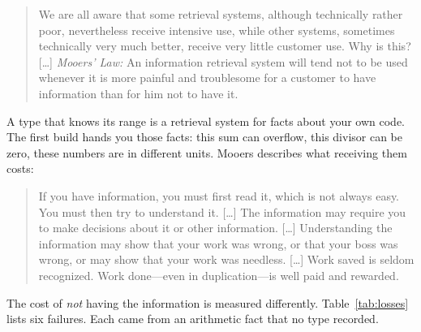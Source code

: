 \documentclass[11pt,a4paper]{article}
\begin{document}
\begin{quote}\small
We are all aware that some retrieval systems, although technically rather
poor, nevertheless receive intensive use, while other systems, sometimes
technically very much better, receive very little customer use. Why is this?
[\dots] \emph{Mooers' Law:} An information retrieval system will tend not to be
used whenever it is more painful and troublesome for a customer to have
information than for him not to have it.
\end{quote}

A type that knows its range is a retrieval system for facts about your own
code. The first build hands you those facts: this sum can overflow, this
divisor can be zero, these numbers are in different units. Mooers describes
what receiving them costs:

\begin{quote}\small
If you have information, you must first read it, which is not always easy. You
must then try to understand it. [\dots] The information may require you to
make decisions about it or other information. [\dots] Understanding the
information may show that your work was wrong, or that your boss was wrong, or
may show that your work was needless. [\dots] Work saved is seldom recognized.
Work done---even in duplication---is well paid and rewarded.
\end{quote}

The cost of \emph{not} having the information is measured differently.
Table~\ref{tab:losses} lists six failures. Each came from an arithmetic fact
that no type recorded.
\end{document}
